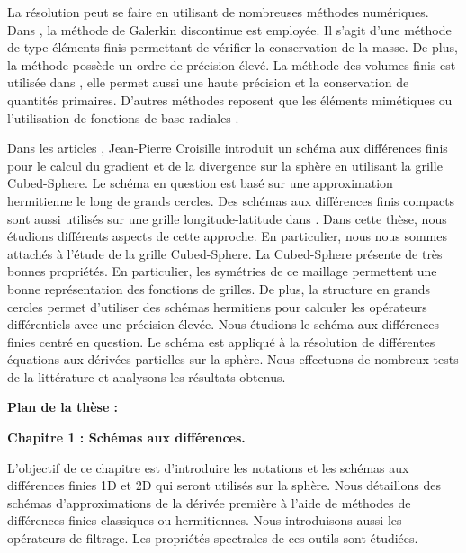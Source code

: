 La résolution peut se faire en utilisant de nombreuses méthodes numériques. Dans \cite{Nair2010}, la méthode de Galerkin discontinue est employée. Il s'agit d'une méthode de type éléments finis permettant de vérifier la conservation de la masse. De plus, la méthode possède un ordre de précision élevé. La méthode des volumes finis est utilisée dans \cite{Chen2008,Ullrich2011}, elle permet aussi une haute précision et la conservation de quantités primaires. D'autres méthodes reposent que les éléments mimétiques \cite{Lauritzen2010} ou l'utilisation de fonctions  de base radiales \cite{Flyer2011}.

Dans les articles \cite{Croisille2015,Croisille2013}, Jean-Pierre Croisille introduit un schéma aux différences finis pour le calcul du gradient et de la divergence sur la sphère en utilisant la grille Cubed-Sphere. Le schéma en question est basé sur une approximation hermitienne le long de grands cercles. Des schémas aux différences finis compacts sont aussi utilisés sur une grille longitude-latitude dans \cite{Ghader2015}. Dans cette thèse, nous étudions différents aspects de cette approche. En particulier, nous nous sommes attachés à l'étude de la grille Cubed-Sphere. La Cubed-Sphere présente de très bonnes propriétés. En particulier, les symétries de ce maillage permettent une bonne représentation des fonctions de grilles. De plus, la structure en grands cercles permet d'utiliser des schémas hermitiens pour calculer les opérateurs différentiels avec une précision élevée. Nous étudions le schéma aux différences finies centré en question. Le schéma est appliqué à la résolution de différentes équations aux dérivées partielles sur la sphère. Nous effectuons de nombreux tests de la littérature et analysons les résultats obtenus.




\vspace{1.3cm}
\textbf{Plan de la thèse :}

\textbf{Chapitre 1 : Schémas aux différences.}

L'objectif de ce chapitre est d'introduire les notations et les schémas aux différences finies 1D et 2D qui seront utilisés sur la sphère. Nous détaillons des schémas d'approximations de la dérivée première à l'aide de méthodes de différences finies classiques ou hermitiennes. Nous introduisons aussi les opérateurs de filtrage. Les propriétés spectrales de ces outils sont étudiées.







